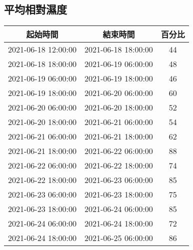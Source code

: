 \documentclass{article}%
\begin{document}
\begin{center}
\section{平均相對濕度}%
\label{sec:}%
\begin{tabular}{|c|c|c|}%
\hline%
起始時間&結束時間&百分比\\%
\hline%
2021{-}06{-}18 12:00:00&2021{-}06{-}18 18:00:00&44\\%
\hline%
2021{-}06{-}18 18:00:00&2021{-}06{-}19 06:00:00&48\\%
\hline%
2021{-}06{-}19 06:00:00&2021{-}06{-}19 18:00:00&46\\%
\hline%
2021{-}06{-}19 18:00:00&2021{-}06{-}20 06:00:00&60\\%
\hline%
2021{-}06{-}20 06:00:00&2021{-}06{-}20 18:00:00&52\\%
\hline%
2021{-}06{-}20 18:00:00&2021{-}06{-}21 06:00:00&54\\%
\hline%
2021{-}06{-}21 06:00:00&2021{-}06{-}21 18:00:00&62\\%
\hline%
2021{-}06{-}21 18:00:00&2021{-}06{-}22 06:00:00&88\\%
\hline%
2021{-}06{-}22 06:00:00&2021{-}06{-}22 18:00:00&74\\%
\hline%
2021{-}06{-}22 18:00:00&2021{-}06{-}23 06:00:00&85\\%
\hline%
2021{-}06{-}23 06:00:00&2021{-}06{-}23 18:00:00&75\\%
\hline%
2021{-}06{-}23 18:00:00&2021{-}06{-}24 06:00:00&85\\%
\hline%
2021{-}06{-}24 06:00:00&2021{-}06{-}24 18:00:00&72\\%
\hline%
2021{-}06{-}24 18:00:00&2021{-}06{-}25 06:00:00&86\\%
\hline%
\end{tabular}

%

\end{center}
\end{document}
